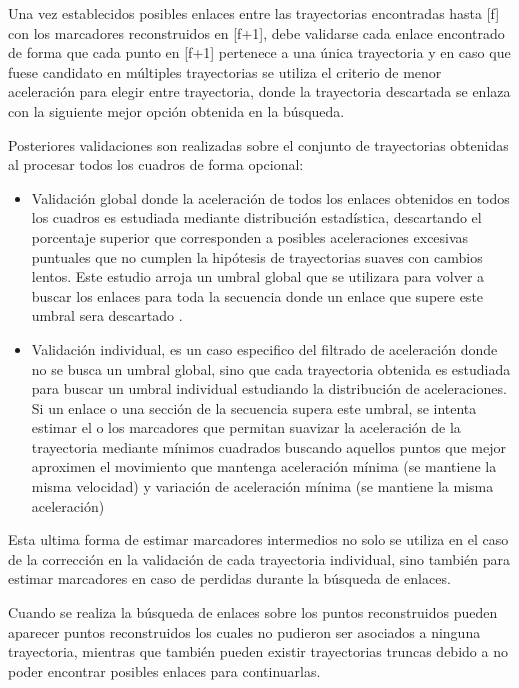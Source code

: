 Una vez establecidos posibles enlaces entre las trayectorias encontradas hasta [f] con los marcadores reconstruidos en [f+1], debe validarse cada enlace encontrado de forma que cada punto en [f+1] pertenece a una única trayectoria y en caso que fuese candidato en múltiples trayectorias se utiliza el criterio de menor aceleración para elegir entre trayectoria, donde la trayectoria descartada se enlaza con la siguiente mejor opción obtenida en la búsqueda.

Posteriores validaciones son realizadas sobre el conjunto de trayectorias obtenidas al procesar todos los cuadros de forma opcional: 

\begin{itemize}

\item Validación global donde la aceleración de todos los enlaces obtenidos en todos los cuadros es estudiada mediante distribución estadística, descartando  el porcentaje superior que corresponden a posibles aceleraciones excesivas puntuales que no cumplen la hipótesis de trayectorias suaves con cambios lentos. Este estudio arroja un umbral global que se utilizara para volver a buscar los enlaces para toda la secuencia donde un enlace que supere este umbral sera descartado .

\item Validación individual, es un caso especifico del filtrado de aceleración donde no se busca un umbral global, sino que cada trayectoria obtenida es estudiada para buscar un umbral individual estudiando la distribución de aceleraciones. Si un enlace o una sección de la secuencia supera este umbral, se intenta estimar el o los marcadores que permitan suavizar la aceleración de la trayectoria mediante mínimos cuadrados buscando aquellos puntos que mejor aproximen el movimiento que mantenga aceleración mínima (se mantiene la misma velocidad) y variación de aceleración mínima (se mantiene la misma aceleración)

\end{itemize}

Esta ultima forma de estimar marcadores intermedios no solo se utiliza en el caso de la corrección en la validación de cada trayectoria individual, sino también para estimar marcadores en caso de perdidas durante la búsqueda de enlaces. 

Cuando se realiza la búsqueda de enlaces sobre los puntos reconstruidos pueden aparecer puntos reconstruidos los cuales no pudieron ser asociados a ninguna trayectoria, mientras que también pueden existir trayectorias truncas debido a no poder encontrar posibles enlaces para continuarlas.

